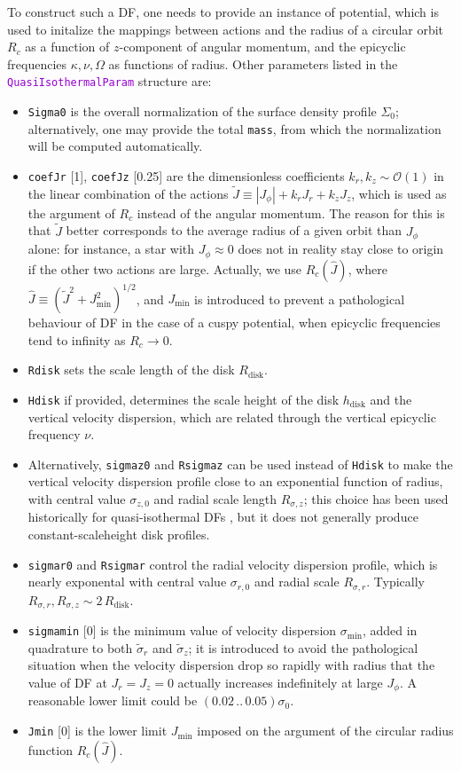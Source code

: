 \documentclass[12pt]{article}
\newcommand{\ttt}[1]{\textcolor{darkviolet}{\texttt{#1}}}
\newcommand{\ppp}[1]{\textcolor{darkolive} {\texttt{#1}}}
\begin{document}
To construct such a DF, one needs to provide an instance of potential, which is used to initalize the mappings between actions and the radius of a circular orbit $R_c$ as a function of $z$-component of angular momentum, and the epicyclic frequencies $\kappa, \nu, \Omega$ as functions of radius. Other parameters listed in the  \ttt{QuasiIsothermalParam} structure are:
\begin{itemize}
\item \ppp{Sigma0} is the overall normalization of the surface density profile $\Sigma_0$; alternatively, one may provide the total \ppp{mass}, from which the normalization will be computed automatically.
\item \ppp{coefJr} [1], \ppp{coefJz} [0.25] are the dimensionless coefficients $k_r,k_z\sim \mathcal{O}(1)$ in the linear combination of the actions $\tilde J \equiv |J_\phi| + k_r J_r + k_z J_z$, which is used as the argument of $R_c$ instead of the angular momentum. The reason for this is that $\tilde J$ better corresponds to the average radius of a given orbit than $J_\phi$ alone: for instance, a star with $J_\phi\approx 0$ does not in reality stay close to origin if the other two actions are large.
Actually, we use $R_c(\hat J)$, where $\hat J \equiv (\tilde J^2 + J_\mathrm{min}^2)^{1/2}$, and $J_\mathrm{min}$ is introduced to prevent a pathological behaviour of DF in the case of a cuspy potential, when epicyclic frequencies tend to infinity as $R_c \to 0$.
\item \ppp{Rdisk} sets the scale length of the disk $R_\mathrm{disk}$.
\item \ppp{Hdisk} if provided, determines the scale height of the disk $h_\mathrm{disk}$ and the vertical velocity dispersion, which are related through the vertical epicyclic frequency $\nu$. 
\item Alternatively, \ppp{sigmaz0} and \ppp{Rsigmaz} can be used instead of \ppp{Hdisk} to make the vertical velocity dispersion profile close to an exponential function of radius, with central value $\sigma_{z,0}$ and radial scale length $R_{\sigma,z}$; this choice has been used historically for quasi-isothermal DFs \cite{BinneyMcMillan2011,Bovy2015}, but it does not generally produce constant-scaleheight disk profiles.
\item \ppp{sigmar0} and \ppp{Rsigmar} control the radial velocity dispersion profile, which is nearly exponental with central value $\sigma_{r,0}$ and radial scale $R_{\sigma,r}$. Typically $R_{\sigma,r}, R_{\sigma,z} \sim 2\,R_\mathrm{disk}$.
\item \ppp{sigmamin} [0] is the minimum value of velocity dispersion $\sigma_\mathrm{min}$, added in quadrature to both $\tilde\sigma_r$ and $\tilde\sigma_z$; it is introduced to avoid the pathological situation when the velocity dispersion drop so rapidly with radius that the value of DF at $J_r=J_z=0$ actually increases indefinitely at large $J_\phi$. A reasonable lower limit could be $(0.02\, .. \, 0.05)\sigma_0$.
\item \ppp{Jmin} [0] is the lower limit $J_\mathrm{min}$ imposed on the argument of the circular radius function $R_c(\hat J)$.
\end{itemize}
\end{document}
